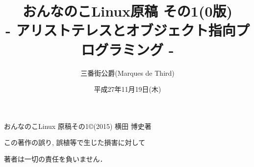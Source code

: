 \documentclass[uplatex,b5j,8pt, twocolumn]{jsarticle}
\title{おんなのこLinux原稿 その1(0版)\\
{- アリストテレスとオブジェクト指向プログラミング -}}
\author{三番街公爵(Marques de Third)}
\date{
平成27年11月19日(木) 
 }
\begin{document}
\maketitle

おんなのこLinux 原稿その1\copyright (2015) 横田 博史著\par

この著作の誤り, 誤植等で生じた損害に対して

著者は一切の責任を負いません．

\newpage
\setcounter{page}{1}


\end{document}
